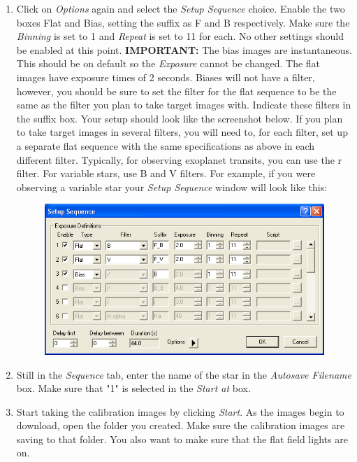 \documentclass[11pt]{report}
\begin{document}
\begin{enumerate}
\item Click on \emph{Options} again and select the \emph{Setup Sequence} choice. Enable the two boxes Flat and Bias, setting the suffix as F and B respectively. Make sure the \emph{Binning} is set to 1 and \emph{Repeat} is set to 11 for each. No other settings should be enabled at this point. {\bf IMPORTANT:} The bias images are instantaneous. This should be on default so the \emph{Exposure} cannot be changed. The flat images have exposure times of 2 seconds. Biases will not have a filter, however, you should be sure to set the filter for the flat sequence to be the same as the filter you plan to take target images with. Indicate these filters in the suffix box. Your setup should look like the screenshot below. If you plan to take target images in several filters, you will need to, for each filter, set up a separate flat sequence with the same specifications as above in each different filter. Typically, for observing exoplanet transits, you can use the r filter. For variable stars, use B and V filters. For example, if you were observing a variable star your \emph{Setup Sequence} window will look like this:

\begin{figure}[!h]
\begin{center}
\includegraphics[totalheight=.2\textheight]{Screenshot.png}
\end{center}
\end{figure}

\item Still in the \emph{Sequence} tab, enter the name of the star in the \emph{Autosave Filename} box. Make sure that "1" is selected in the \emph{Start at} box. 
\item Start taking the calibration images by clicking \emph{Start}. As the images begin to download, open the folder you created. Make sure the calibration images are saving to that folder. You also want to make sure that the flat field lights are on.
\end{enumerate}
\end{document}
